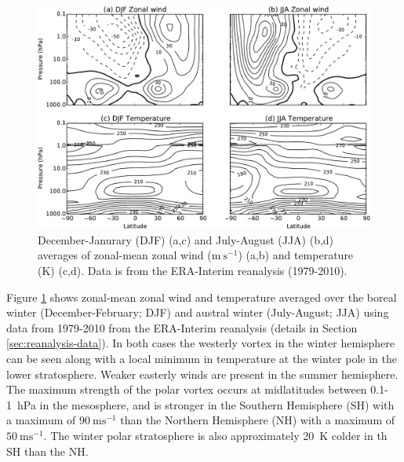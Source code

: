 \begin{figure}
 \centering
 \noindent\includegraphics[width=\textwidth]{figures/chapter-intro/zmzw_zmT_clim.pdf}
 \caption[Zonal-mean zonal wind and temperature climatology.]{December-Janurary
   (DJF) (a,c) and July-August (JJA) (b,d) averages of zonal-mean zonal wind
   ($\mathrm{m~s^{-1}}$) (a,b) and temperature (K) (c,d). Data is from the
   ERA-Interim reanalysis (1979-2010).}
 \label{fig:zmzw_zmT_clim}
\end{figure}

Figure \ref{fig:zmzw_zmT_clim} shows zonal-mean zonal wind and temperature
averaged over the boreal winter (December-February; DJF) and austral winter
(July-August; JJA) using data from 1979-2010 from the ERA-Interim reanalysis
(details in Section \ref{sec:reanalysis-data}). In both cases the westerly
vortex in the winter hemisphere can be seen along with a local minimum in
temperature at the winter pole in the lower stratosphere. Weaker easterly winds
are present in the summer hemisphere. The maximum strength of the polar vortex
occurs at midlatitudes between 0.1-1~hPa in the mesosphere, and is stronger in
the Southern Hemisphere (SH) with a maximum of $90~\mathrm{ms^{-1}}$ than the
Northern Hemisphere (NH) with a maximum of $50~\mathrm{ms^{-1}}$. The winter
polar stratosphere is also approximately 20~K colder in th SH than the NH. 

